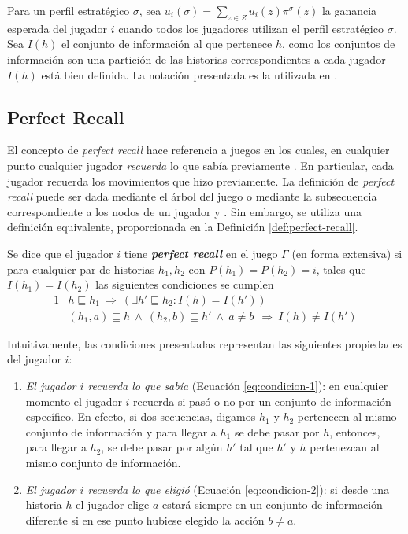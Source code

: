 Para un perfil estratégico $\sigma$, sea $u_i(\sigma) = \sum_{z \in Z} u_i(z)\pi^{\sigma}(z)$ la ganancia esperada del jugador $i$ cuando todos los jugadores utilizan el perfil estratégico $\sigma$. Sea $I(h)$ el conjunto de información al que pertenece $h$, como los conjuntos de información son una partición de las historias correspondientes a cada jugador $I(h)$ está bien definida. La notación presentada es la utilizada en \cite{bib:cfr}.

\subsection{Perfect Recall}

El concepto de \textit{perfect recall} hace referencia a juegos en los cuales, en cualquier punto cualquier jugador \textit{recuerda} lo que sabía previamente \cite[p.~203]{bib:course-game-theory}. En particular, cada jugador recuerda los movimientos que hizo previamente. La definición de \textit{perfect recall} puede ser dada mediante el árbol del juego \cite{bib:conceptos-basicos} o mediante la subsecuencia correspondiente a los nodos de un jugador \cite[p.~203]{bib:course-game-theory} y \cite[p.~44]{bib:handbook-blai}. Sin embargo, se utiliza una definición equivalente, proporcionada en la Definición \ref{def:perfect-recall}.

\begin{definition}
\label{def:perfect-recall}
Se dice que el jugador $i$ tiene \textbf{\textit{perfect recall}} en el juego $\Gamma$ (en forma extensiva) si para cualquier par de historias $h_1, h_2$ con $P(h_1) = P(h_2) = i$, tales que $I(h_1) = I(h_2)$ las siguientes condiciones se cumplen
\begin{alignat}{1}
& h \sqsubseteq h_1\ \Rightarrow\ (\exists h' \sqsubseteq h_2 : I(h) = I(h') )
\label{eq:condicion-1}\\
& (h_1, a) \sqsubseteq h\  \land\ (h_2, b)\sqsubseteq h'\ \land\ a \neq b\ \  \Rightarrow\ I(h) \neq I(h')
\label{eq:condicion-2}
\end{alignat}
\end{definition}

Intuitivamente, las condiciones presentadas representan las siguientes propiedades del jugador $i$:
\begin{enumerate}[noitemsep]
\item \textit{El jugador $i$ recuerda lo que sabía} (Ecuación \ref{eq:condicion-1}): en cualquier momento el jugador $i$ recuerda si pasó o no por un conjunto de información específico. En efecto, si dos secuencias, digamos $h_1$ y $h_2$ pertenecen al mismo conjunto de información y para llegar a $h_1$ se debe pasar por $h$, entonces, para llegar a $h_2$, se debe pasar por algún $h'$ tal que $h'$ y $h$ pertenezcan al mismo conjunto de información. 

\item \textit{El jugador $i$ recuerda lo que eligió} (Ecuación \ref{eq:condicion-2}): si desde una historia $h$ el jugador elige $a$ estará siempre en un conjunto de información diferente si en ese punto hubiese elegido la acción $b \neq a$.
\end{enumerate}

